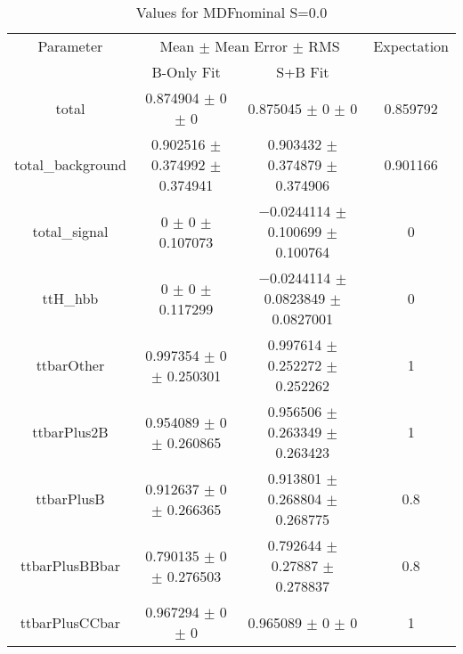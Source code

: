 \begin{table}
\centering
\caption{Values for MDFnominal S=0.0}
\begin{tabular}{cccc}
\toprule
Parameter & \multicolumn{2}{c}{Mean $\pm$ Mean Error $\pm$ RMS} & Expectation\\
 & B-Only Fit & S+B Fit & \\
\midrule
total & \num{0.874904} $\pm$ \num{0} $\pm$ \num{0} & \num{0.875045} $\pm$ \num{0} $\pm$ \num{0} & \num{0.859792}\\
total\_background & \num{0.902516} $\pm$ \num{0.374992} $\pm$ \num{0.374941} & \num{0.903432} $\pm$ \num{0.374879} $\pm$ \num{0.374906} & \num{0.901166}\\
total\_signal & \num{0} $\pm$ \num{0} $\pm$ \num{0.107073} & \num{-0.0244114} $\pm$ \num{0.100699} $\pm$ \num{0.100764} & \num{0}\\
ttH\_hbb & \num{0} $\pm$ \num{0} $\pm$ \num{0.117299} & \num{-0.0244114} $\pm$ \num{0.0823849} $\pm$ \num{0.0827001} & \num{0}\\
ttbarOther & \num{0.997354} $\pm$ \num{0} $\pm$ \num{0.250301} & \num{0.997614} $\pm$ \num{0.252272} $\pm$ \num{0.252262} & \num{1}\\
ttbarPlus2B & \num{0.954089} $\pm$ \num{0} $\pm$ \num{0.260865} & \num{0.956506} $\pm$ \num{0.263349} $\pm$ \num{0.263423} & \num{1}\\
ttbarPlusB & \num{0.912637} $\pm$ \num{0} $\pm$ \num{0.266365} & \num{0.913801} $\pm$ \num{0.268804} $\pm$ \num{0.268775} & \num{0.8}\\
ttbarPlusBBbar & \num{0.790135} $\pm$ \num{0} $\pm$ \num{0.276503} & \num{0.792644} $\pm$ \num{0.27887} $\pm$ \num{0.278837} & \num{0.8}\\
ttbarPlusCCbar & \num{0.967294} $\pm$ \num{0} $\pm$ \num{0} & \num{0.965089} $\pm$ \num{0} $\pm$ \num{0} & \num{1}\\
\bottomrule
\end{tabular}
\end{table}